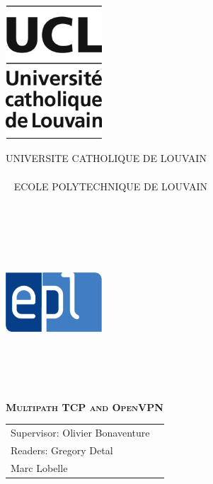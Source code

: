 \documentclass[a4paper, 12pt]{report}
\renewcommand\title{Multipath TCP and OpenVPN}
\newcommand\supervisor{ \textsc{}}
\newcommand\readerone{ \textsc{}}
\newcommand\readertwo{ \textsc{}}
\begin{document}
  \nocite{*}

  \thispagestyle{empty}
  \noindent\begin{minipage}{.25\textwidth}
  \noindent\includegraphics[width=3.6cm]{./images/ucl.jpg}
  \end{minipage}
  \begin{minipage}{.5\textwidth}
  \begin{center}
  UNIVERSITE CATHOLIQUE DE LOUVAIN
  \\~\\~
  ECOLE POLYTECHNIQUE DE LOUVAIN
  \\~\\~\\~\\~\\~
  \end{center}
  \end{minipage}
  \begin{minipage}{.25\textwidth}
  \hfill\includegraphics[width=3.6cm]{./images/epl.jpg}
  \\~\\~\\~\\~
  \end{minipage}
  \vspace{4.5cm}
  \begin{center}
  \bfseries{\scshape{\Huge{\title}}}
  \end{center}
  \vspace{4.5cm}
  \begin{minipage}{.5\textwidth}
  \begin{tabular}{ll}
  Supervisor: Olivier Bonaventure & \supervisor
  \\ Readers: Gregory Detal & \readerone
  \\          Marc Lobelle & \readertwo
  \end{tabular}
  \\~\\~
  \end{minipage}
\end{document}
